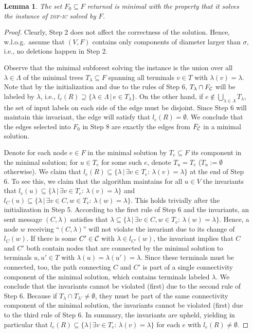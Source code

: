 \documentclass[letterpaper,11pt]{article}
\newtheorem{lemma}[theorem]{Lemma}
\newcommand{\Comp}{\lambda}
\newcommand{\sfic}{\textsc{dsf-ic}\xspace}
\begin{document}
\begin{lemma}\label{lemma:prune_correct}
The set $F_0\subseteq F$ returned is minimal with the property that it solves
the instance of \sfic solved by $F$.
\end{lemma}
\begin{proof}
Clearly, Step 2 does not affect the correctness of the solution. Hence,
w.l.o.g.\ assume that $(V,F)$ contains only components of diameter larger than
$\sigma$, i.e., no deletions happen in Step 2.

Observe that the minimal subforest solving the instance is the union over all
$\Comp\in \Lambda$ of the minimal trees $T_{\Comp}\subseteq F$ spanning all
terminals $v\in T$ with $\Comp(v)=\Comp$. Note that by the initialization and
due to the rules of Step 6, $T_{\Comp}\cap F_{\cal C}$ will be labeled by
$\Comp$, i.e., $l_e(R)\supseteq \{\Comp \in
\Lambda\,|\,e\in T_{\Comp}\}$. On the other hand, if $e\notin \bigcup_{\Comp
\in \Lambda}T_{\Comp}$, the set of input labels on each side of the edge must be
disjoint. Since Step 6 will maintain this invariant, the edge will satisfy that
$l_e(R)=\emptyset$. We conclude that the edges selected into $F_0$ in Step 8 are
exactly the edges from $F_{\cal C}$ in a minimal solution.

Denote for each node $e\in F$ in the minimal solution by $T_e\subseteq F$ its
component in the minimal solution; for $u\in T_e$ for some such $e$, denote
$T_u=T_e$ ($T_u:=\emptyset$ otherwise). We claim that $l_e(R)\subseteq
\{\Comp\,|\,\exists v\in T_e:\,\Comp(v)=\Comp\}$ at the end of Step 6. To see
this, we claim that the algorithm maintains for all $u\in V$ the invariants that
$l_e(u)\subseteq \{\Comp\,|\,\exists v\in T_e:\,\Comp(v)=\Comp\}$ and
$l_C(u)\subseteq \{\Comp\,|\,\exists v\in C, w\in T_v:\,\Comp(w)=\Comp\}$. This
holds trivially after the initialization in Step 5. According to the first rule
of Step 6 and the invariants, an sent message $(C,\Comp)$ satisfies that $\Comp
\subseteq \{\Comp\,|\,\exists v\in C, w\in T_v:\,\Comp(w)=\Comp\}$. Hence, a
node $w$ receiving ``$(C,\Comp)$'' will not violate the invariant due to its
change of $l_C(w)$. If there is some $C'\in {\cal C}$ with $\Comp\in l_{C'}(w)$,
the invariant implies that $C$ and $C'$ both contain nodes that are connected by
the minimal solution to terminals $u,u'\in T$ with $\Comp(u)=\Comp(u')=\Comp$.
Since these terminals must be connected, too, the path connecting $C$ and $C'$
is part of a single connectivity component of the minimal solution, which
contains terminals labeled $\Comp$. We conclude that the invariants cannot be
violated (first) due to the second rule of Step 6. Because if $T_{\Comp}\cap
T_{\Comp'}\neq \emptyset$, they must be part of the same connectivity component
of the minimal solution, the invariants cannot be violated (first) due to the
third rule of Step 6. In summary, the invariants are upheld, yielding in
particular that $l_e(R)\subseteq \{\Comp\,|\,\exists v\in
T_e:\,\Comp(v)=\Comp\}$ for each $e$ with $l_e(R)\neq \emptyset$.


\end{proof}
\end{document}
